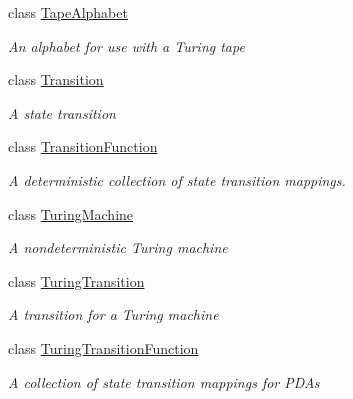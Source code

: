 \begin{DoxyCompactItemize}
class \mbox{\hyperlink{class_system_1_1_automata_1_1_tape_alphabet}{Tape\+Alphabet}}
\begin{DoxyCompactList}\small\item\em An alphabet for use with a Turing tape \end{DoxyCompactList}\item 
class \mbox{\hyperlink{class_system_1_1_automata_1_1_transition}{Transition}}
\begin{DoxyCompactList}\small\item\em A state transition \end{DoxyCompactList}\item 
class \mbox{\hyperlink{class_system_1_1_automata_1_1_transition_function}{Transition\+Function}}
\begin{DoxyCompactList}\small\item\em A deterministic collection of state transition mappings. \end{DoxyCompactList}\item 
class \mbox{\hyperlink{class_system_1_1_automata_1_1_turing_machine}{Turing\+Machine}}
\begin{DoxyCompactList}\small\item\em A nondeterministic Turing machine \end{DoxyCompactList}\item 
class \mbox{\hyperlink{class_system_1_1_automata_1_1_turing_transition}{Turing\+Transition}}
\begin{DoxyCompactList}\small\item\em A transition for a Turing machine \end{DoxyCompactList}\item 
class \mbox{\hyperlink{class_system_1_1_automata_1_1_turing_transition_function}{Turing\+Transition\+Function}}
\begin{DoxyCompactList}\small\item\em A collection of state transition mappings for P\+D\+As \end{DoxyCompactList}\end{DoxyCompactItemize}
